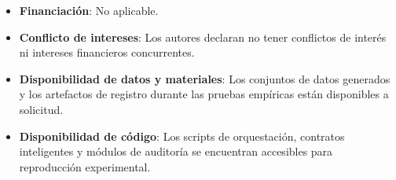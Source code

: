 \documentclass[pdflatex,sn-mathphys-num]{sn-jnl}
\theoremstyle{thmstyleone}
\theoremstyle{thmstyletwo}
\theoremstyle{thmstylethree}
\begin{document}

\maketitle








\begin{itemize}
    \item \textbf{Financiación}: No aplicable.
    \item \textbf{Conflicto de intereses}: Los autores declaran no tener conflictos de interés ni intereses financieros concurrentes.
    \item \textbf{Disponibilidad de datos y materiales}: Los conjuntos de datos generados y los artefactos de registro durante las pruebas empíricas están disponibles a solicitud.
    \item \textbf{Disponibilidad de código}: Los scripts de orquestación, contratos inteligentes y módulos de auditoría se encuentran accesibles para reproducción experimental.
\end{itemize}


\end{document}
